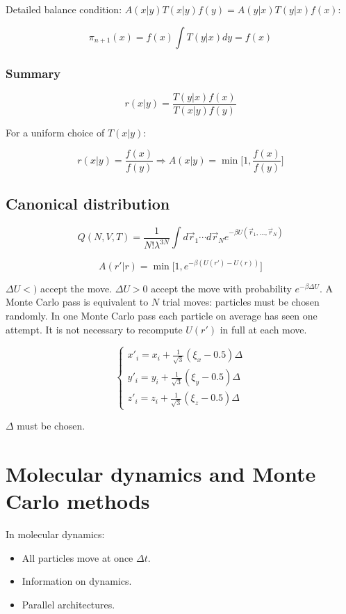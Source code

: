	Detailed balance condition: $A(x|y)T(x|y)f(y) = A(y|x)T(y|x)f(x)$:

	$$\pi_{n+1}(x) = f(x)\int T(y|x)dy = f(x)$$

		\subsubsection{Summary}

		$$r(x|y) = \frac{T(y|x)f(x)}{T(x|y)f(y)}$$

		For a uniform choice of $T(x|y)$:

		$$r(x|y) = \frac{f(x)}{f(y)}\Rightarrow A(x|y) = \min\biggl[1, \frac{f(x)}{f(y)}\biggr]$$

	\subsection{Canonical distribution}

	$$Q(N, V, T) = \frac{1}{N!\lambda^{3N}}\int d\vec{r}_1\cdots d\vec{r}_Ne^{-\beta U(\vec{r}_1, \dots, \vec{r}_N)}$$

	$$A(r'|r) = \min\bigl[1, e^{-\beta(U(r')-U(r))}\bigr]$$

	$\Delta U < )$ accept the move.
	$\Delta U > 0$ accept the move with probability $e^{-\beta\Delta U}$.
	A Monte Carlo pass is equivalent to $N$ trial moves: particles must be chosen randomly.
	In one Monte Carlo pass each particle on average has seen one attempt.
	It is not necessary to recompute $U(r')$ in full at each move.

	$$\begin{cases}x'_i = x_i+\frac{1}{\sqrt{3}}(\xi_x-0.5)\Delta\\y'_i = y_i+\frac{1}{\sqrt{3}}(\xi_y-0.5)\Delta\\z'_i = z_i+\frac{1}{\sqrt{3}}(\xi_z-0.5)\Delta\end{cases}$$

	$\Delta$ must be chosen.

\section{Molecular dynamics and Monte Carlo methods}
In molecular dynamics:

\begin{multicols}{2}
	\begin{itemize}
		\item All particles move at once $\Delta t$.
		\item Information on dynamics.
		\item Parallel architectures.
	\end{itemize}
\end{multicols}

